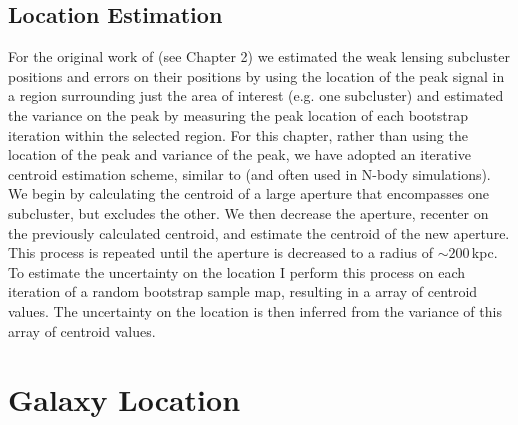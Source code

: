 \subsection{Location Estimation}\label{section:LocationEstimation}
For the original work of \citet{Dawson:2012dl} (see Chapter 2) we estimated the weak lensing subcluster positions and errors on their positions by using the location of the peak signal in a region surrounding just the area of interest (e.g. one subcluster) and estimated the variance on the peak by measuring the peak location of each bootstrap iteration within the selected region.  
For this chapter, rather than using the location of the peak and variance of the peak, we have adopted an iterative centroid estimation scheme, similar to \citet{Randall:2008hs} (and often used in N-body simulations). 
We begin by calculating the centroid of a large aperture that encompasses one subcluster, but excludes the other.
We then decrease the aperture, recenter on the previously calculated centroid, and estimate the centroid of the new aperture.
This process is repeated until the aperture is decreased to a radius of $\sim200$\,kpc.
To estimate the uncertainty on the location I perform this process on each iteration of a random bootstrap sample map, resulting in a array of centroid values.
 The uncertainty on the location is then inferred from the variance of this array of centroid values.


\section{Galaxy Location}\label{section:GalaxyLocation}

